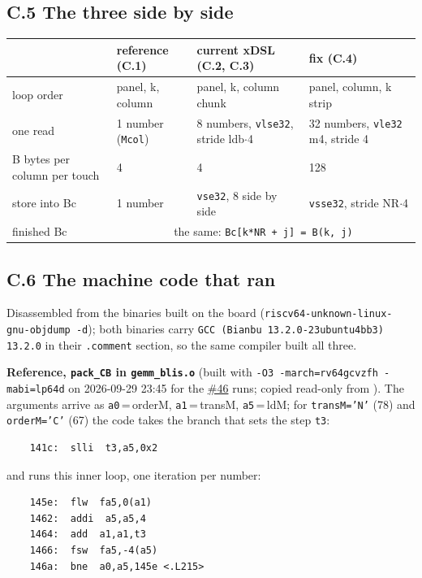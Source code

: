 \documentclass[10pt,a4paper]{article}
\newcommand{\iss}[1]{\href{https://github.com/JieGH/RVV_code_gen_via_MLIR_xDSL/issues/#1}{\##1}}
\begin{document}
\subsection*{C.5 The three side by side}
\begin{center}\footnotesize\setlength{\tabcolsep}{4pt}
\begin{tabular}{@{}llll@{}}
\toprule
 & reference (C.1) & current xDSL (C.2, C.3) & fix (C.4) \\
\midrule
loop order & panel, k, column & panel, k, column chunk & panel, column, k strip \\
one read & 1 number (\texttt{Mcol}) & 8 numbers, \texttt{vlse32}, stride ldb$\cdot$4 & 32 numbers, \texttt{vle32} m4, stride 4 \\
B bytes per column per touch & 4 & 4 & 128 \\
store into Bc & 1 number & \texttt{vse32}, 8 side by side & \texttt{vsse32}, stride NR$\cdot$4 \\
finished Bc & \multicolumn{3}{c}{the same: \texttt{Bc[k*NR + j] = B(k, j)}} \\
\bottomrule
\end{tabular}
\end{center}


\subsection*{C.6 The machine code that ran}
Disassembled from the binaries built on the board (\texttt{riscv64-unknown-linux-gnu-objdump -d}); both binaries carry
\texttt{GCC (Bianbu 13.2.0-23ubuntu4bb3) 13.2.0} in their \texttt{.comment} section, so the same compiler built all three.

\textbf{Reference, \texttt{pack\_CB} in \texttt{gemm\_blis.o}} (built with \texttt{-O3 -march=rv64gcvzfh -mabi=lp64d} on 2026-09-29 23:45
for the \iss{46} runs; copied read-only from ). The arguments arrive as
\texttt{a0}\,=\,orderM, \texttt{a1}\,=\,transM, \texttt{a5}\,=\,ldM; for \texttt{transM='N'} (78) and \texttt{orderM='C'} (67) the code takes the
branch that sets the step \texttt{t3}:
{\footnotesize\begin{verbatim}
    141c:  slli  t3,a5,0x2
\end{verbatim}}
and runs this inner loop, one iteration per number:
{\footnotesize\begin{verbatim}
    145e:  flw  fa5,0(a1)
    1462:  addi  a5,a5,4
    1464:  add  a1,a1,t3
    1466:  fsw  fa5,-4(a5)
    146a:  bne  a0,a5,145e <.L215>
\end{verbatim}}
\end{document}
